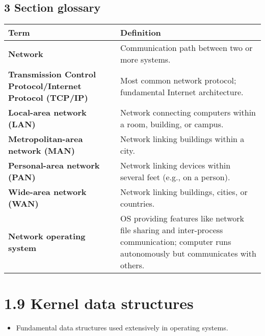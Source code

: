 \documentclass{article}
\begin{document}
\subsection*{3 Section glossary}
\centering
\begin{tabular}{>{\raggedright}p{} >{\raggedright\arraybackslash}p{}}
\toprule
\textbf{Term} & \textbf{Definition} \\
\midrule
\textbf{Network} & Communication path between two or more systems. \\
\textbf{Transmission Control Protocol/Internet Protocol (TCP/IP)} & Most common network protocol; fundamental Internet architecture. \\
\textbf{Local-area network (LAN)} & Network connecting computers within a room, building, or campus. \\
\textbf{Metropolitan-area network (MAN)} & Network linking buildings within a city. \\
\textbf{Personal-area network (PAN)} & Network linking devices within several feet (e.g., on a person). \\
\textbf{Wide-area network (WAN)} & Network linking buildings, cities, or countries. \\
\textbf{Network operating system} & OS providing features like network file sharing and inter-process communication; computer runs autonomously but communicates with others. \\
\bottomrule
\end{tabular}
\vspace{\baselineskip}
\newpage
\section*{1.9 Kernel data structures}
\begin{itemize}
    \item Fundamental data structures used extensively in operating systems.
\end{itemize}
\end{document}
